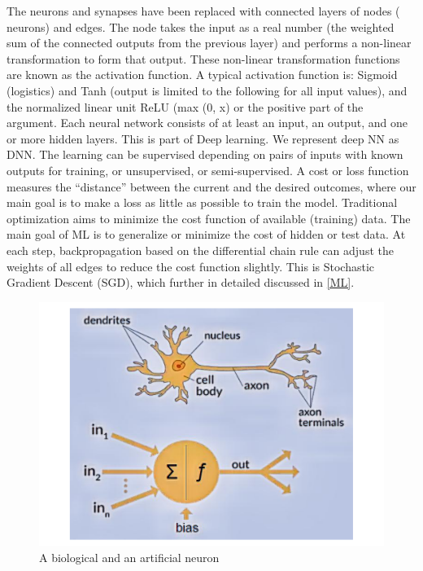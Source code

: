 The neurons and synapses have been replaced with connected layers of nodes ( neurons)
and edges. The node takes the input as a real number (the weighted sum of the connected outputs from the previous layer) and performs a non-linear transformation to form that output\cite{Bourilkov_2019}.
These non-linear transformation functions are known as the activation function. A typical activation function is: Sigmoid (logistics) and Tanh (output is limited to the following for all input values), and the normalized linear unit ReLU (max (0, x) or the positive part of the argument. Each neural network consists of at least an input, an output, and one or more hidden layers. This is part of Deep learning. We represent deep NN as DNN. The learning can be supervised depending on pairs of inputs with known outputs for training, or unsupervised,
or semi-supervised. A cost or loss function measures the “distance” between the current
and the desired outcomes, where our main goal is to make a loss as little as possible to
train the model. Traditional optimization aims to minimize the cost function of available (training) data. The main goal of ML is to generalize or minimize the cost of hidden or  test data. At each step,  backpropagation based on the differential chain rule can adjust the weights of all edges to reduce the cost function slightly. This is Stochastic Gradient Descent (SGD), which further in detailed discussed in \autoref{ML}.

\begin{figure}[h]
    \centering
    \includegraphics[scale=0.2]{Figure/img_neuron.pdf}
    \caption{A biological and an artificial neuron}
    \label{fig:my_label_NN_ANNN}
\end{figure}

